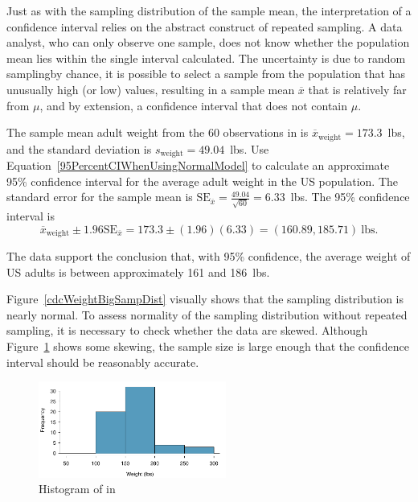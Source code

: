 Just as with the sampling distribution of the sample mean, the interpretation of a confidence interval relies on the abstract construct of repeated sampling. A data analyst, who can only observe one sample, does not know whether the population mean lies within the single interval calculated. The uncertainty is due to random sampling\textemdash by chance, it is possible to select a sample from the population that has unusually high (or low) values, resulting in a sample mean $\overline{x}$ that is relatively far from $\mu$, and by extension, a confidence interval that does not contain $\mu$. 

\begin{example}{The sample mean adult weight from the 60 observations in  is $\overline{x}_{\text{weight}} = 173.3$~lbs, and the standard deviation is $s_{\text{weight}} = 49.04$~lbs.  Use Equation~\ref{95PercentCIWhenUsingNormalModel} to calculate an approximate 95\% confidence interval for the average adult weight in the US population.}
  The standard error for the sample mean is  $\text{SE}_{\overline{x}}=\frac{49.04}{\sqrt{60}} = 6.33$~lbs. The 95\% confidence interval is
 \[\overline{x}_{\text{weight}} \pm 1.96 \text{SE}_{\overline{x}} = 173.3 \pm (1.96)(6.33) = (160.89, 185.71)~\text{lbs.} \]
  
  The data support the conclusion that, with 95\% confidence, the average weight of US adults is between approximately 161 and 186~lbs.
  
  Figure~\ref{cdcWeightBigSampDist} visually shows that the sampling distribution is nearly normal. To assess normality of the sampling distribution without repeated sampling, it is necessary to check whether the data are skewed. Although Figure~\ref{cdcWeightHist} shows some skewing, the sample size is large enough that the confidence interval should be reasonably accurate.
  
  \begin{figure}[h!]
  	\centering
  	\includegraphics[width=0.55\textwidth]
  	{ch_inference_foundations_oi_biostat/figures/cdcWeightHist/cdcWeightHist.pdf}
  	\caption{Histogram of  in  }
  	\label{cdcWeightHist}
  \end{figure}
  
  \end{example}

